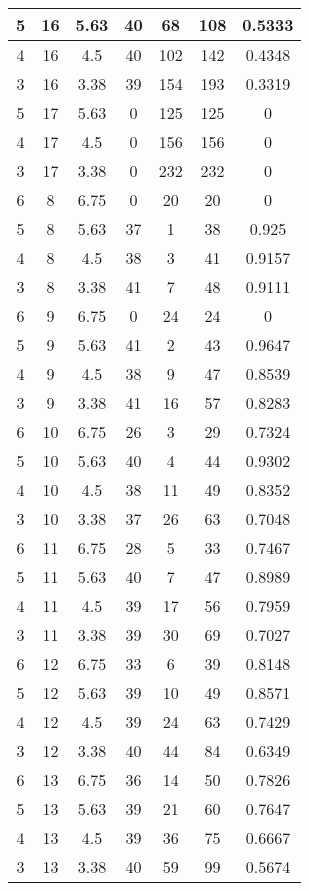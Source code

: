 \documentclass[letterpaper, 12pt]{article}
\begin{document}
\begin{longtable}{|c|c|c|c|c|c|c|}
\hline
5 & 16 & 5.63 & 40 & 68 & 108 & 0.5333 \\
\hline
4 & 16 & 4.5 & 40 & 102 & 142 & 0.4348 \\
\hline
3 & 16 & 3.38 & 39 & 154 & 193 & 0.3319 \\
\hline
5 & 17 & 5.63 & 0 & 125 & 125 & 0 \\
\hline
4 & 17 & 4.5 & 0 & 156 & 156 & 0 \\
\hline
3 & 17 & 3.38 & 0 & 232 & 232 & 0 \\
\hline
6 & 8 & 6.75 & 0 & 20 & 20 & 0 \\
\hline
5 & 8 & 5.63 & 37 & 1 & 38 & 0.925 \\
\hline
4 & 8 & 4.5 & 38 & 3 & 41 & 0.9157 \\
\hline
3 & 8 & 3.38 & 41 & 7 & 48 & 0.9111 \\
\hline
6 & 9 & 6.75 & 0 & 24 & 24 & 0 \\
\hline
5 & 9 & 5.63 & 41 & 2 & 43 & 0.9647 \\
\hline
4 & 9 & 4.5 & 38 & 9 & 47 & 0.8539 \\
\hline
3 & 9 & 3.38 & 41 & 16 & 57 & 0.8283 \\
\hline
6 & 10 & 6.75 & 26 & 3 & 29 & 0.7324 \\
\hline
5 & 10 & 5.63 & 40 & 4 & 44 & 0.9302 \\
\hline
4 & 10 & 4.5 & 38 & 11 & 49 & 0.8352 \\
\hline
3 & 10 & 3.38 & 37 & 26 & 63 & 0.7048 \\
\hline
6 & 11 & 6.75 & 28 & 5 & 33 & 0.7467 \\
\hline
5 & 11 & 5.63 & 40 & 7 & 47 & 0.8989 \\
\hline
4 & 11 & 4.5 & 39 & 17 & 56 & 0.7959 \\
\hline
3 & 11 & 3.38 & 39 & 30 & 69 & 0.7027 \\
\hline
6 & 12 & 6.75 & 33 & 6 & 39 & 0.8148 \\
\hline
5 & 12 & 5.63 & 39 & 10 & 49 & 0.8571 \\
\hline
4 & 12 & 4.5 & 39 & 24 & 63 & 0.7429 \\
\hline
3 & 12 & 3.38 & 40 & 44 & 84 & 0.6349 \\
\hline
6 & 13 & 6.75 & 36 & 14 & 50 & 0.7826 \\
\hline
5 & 13 & 5.63 & 39 & 21 & 60 & 0.7647 \\
\hline
4 & 13 & 4.5 & 39 & 36 & 75 & 0.6667 \\
\hline
3 & 13 & 3.38 & 40 & 59 & 99 & 0.5674 \\
\hline

\end{longtable}
\end{document}

